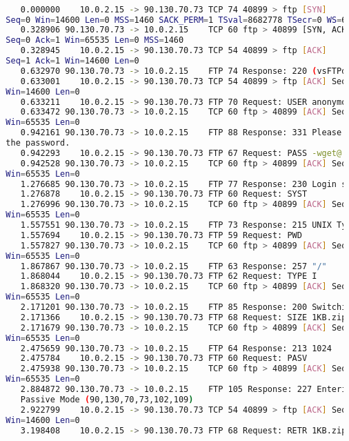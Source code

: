 \documentclass[a4paper]{report} %
\begin{document}
\begin{lstlisting}[language=bash]

     0.000000    10.0.2.15 -> 90.130.70.73 TCP 74 40899 > ftp [SYN] 
  Seq=0 Win=14600 Len=0 MSS=1460 SACK_PERM=1 TSval=8682778 TSecr=0 WS=64
     0.328906 90.130.70.73 -> 10.0.2.15    TCP 60 ftp > 40899 [SYN, ACK] 
  Seq=0 Ack=1 Win=65535 Len=0 MSS=1460
     0.328945    10.0.2.15 -> 90.130.70.73 TCP 54 40899 > ftp [ACK] 
  Seq=1 Ack=1 Win=14600 Len=0
     0.632970 90.130.70.73 -> 10.0.2.15    FTP 74 Response: 220 (vsFTPd 2.3.5)
     0.633001    10.0.2.15 -> 90.130.70.73 TCP 54 40899 > ftp [ACK] Seq=1 Ack=21 
  Win=14600 Len=0
     0.633211    10.0.2.15 -> 90.130.70.73 FTP 70 Request: USER anonymous
     0.633472 90.130.70.73 -> 10.0.2.15    TCP 60 ftp > 40899 [ACK] Seq=21 Ack=17 
  Win=65535 Len=0 
     0.942161 90.130.70.73 -> 10.0.2.15    FTP 88 Response: 331 Please specify 
  the password.
     0.942293    10.0.2.15 -> 90.130.70.73 FTP 67 Request: PASS -wget@
     0.942528 90.130.70.73 -> 10.0.2.15    TCP 60 ftp > 40899 [ACK] Seq=55 Ack=30 
  Win=65535 Len=0
     1.276685 90.130.70.73 -> 10.0.2.15    FTP 77 Response: 230 Login successful.
     1.276878    10.0.2.15 -> 90.130.70.73 FTP 60 Request: SYST
     1.276996 90.130.70.73 -> 10.0.2.15    TCP 60 ftp > 40899 [ACK] Seq=78 Ack=36  
  Win=65535 Len=0
     1.557551 90.130.70.73 -> 10.0.2.15    FTP 73 Response: 215 UNIX Type: L8
     1.557694    10.0.2.15 -> 90.130.70.73 FTP 59 Request: PWD
     1.557827 90.130.70.73 -> 10.0.2.15    TCP 60 ftp > 40899 [ACK] Seq=97 Ack=41 
  Win=65535 Len=0
     1.867867 90.130.70.73 -> 10.0.2.15    FTP 63 Response: 257 "/"
     1.868044    10.0.2.15 -> 90.130.70.73 FTP 62 Request: TYPE I
     1.868320 90.130.70.73 -> 10.0.2.15    TCP 60 ftp > 40899 [ACK] Seq=106 Ack=49 
  Win=65535 Len=0
     2.171201 90.130.70.73 -> 10.0.2.15    FTP 85 Response: 200 Switching to Binary mode.
     2.171366    10.0.2.15 -> 90.130.70.73 FTP 68 Request: SIZE 1KB.zip
     2.171679 90.130.70.73 -> 10.0.2.15    TCP 60 ftp > 40899 [ACK] Seq=137 Ack=63 
  Win=65535 Len=0
     2.475659 90.130.70.73 -> 10.0.2.15    FTP 64 Response: 213 1024
     2.475784    10.0.2.15 -> 90.130.70.73 FTP 60 Request: PASV
     2.475938 90.130.70.73 -> 10.0.2.15    TCP 60 ftp > 40899 [ACK] Seq=147 Ack=69 
  Win=65535 Len=0
     2.884872 90.130.70.73 -> 10.0.2.15    FTP 105 Response: 227 Entering 
     Passive Mode (90,130,70,73,102,109)
     2.922799    10.0.2.15 -> 90.130.70.73 TCP 54 40899 > ftp [ACK] Seq=69 Ack=197 
  Win=14600 Len=0
     3.198408    10.0.2.15 -> 90.130.70.73 FTP 68 Request: RETR 1KB.zip

\end{lstlisting}
\end{document}
